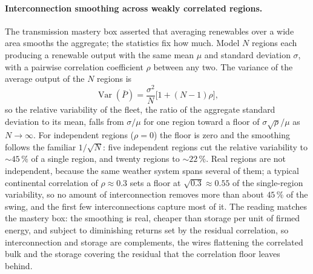 \paragraph{Interconnection smoothing across weakly correlated regions.} The
transmission mastery box asserted that averaging renewables over a wide area
smooths the aggregate; the statistics fix how much. Model $N$ regions each
producing a renewable output with the same mean $\mu$ and standard deviation
$\sigma$, with a pairwise correlation coefficient $\rho$ between any two. The
variance of the average output of the $N$ regions is
\[
\operatorname{Var}\!\left(\bar{P}\right) = \frac{\sigma^2}{N}\bigl[1 +
(N-1)\rho\bigr],
\]
so the relative variability of the fleet, the ratio of the aggregate standard
deviation to its mean, falls from $\sigma/\mu$ for one region toward a floor of
$\sigma\sqrt{\rho}/\mu$ as $N\to\infty$. For independent regions ($\rho = 0$)
the floor is zero and the smoothing follows the familiar $1/\sqrt{N}$: five
independent regions cut the relative variability to $\sim 45\,\%$ of a single
region, and twenty regions to $\sim 22\,\%$. Real regions are not independent,
because the same weather system spans several of them; a typical continental
correlation of $\rho \approx 0.3$ sets a floor at $\sqrt{0.3} \approx 0.55$ of
the single-region variability, so no amount of interconnection removes more
than about $45\,\%$ of the swing, and the first few interconnections capture
most of it. The reading matches the mastery box: the smoothing is real,
cheaper than storage per unit of firmed energy, and subject to diminishing
returns set by the residual correlation, so interconnection and storage are
complements, the wires flattening the correlated bulk and the storage
covering the residual that the correlation floor leaves behind.

